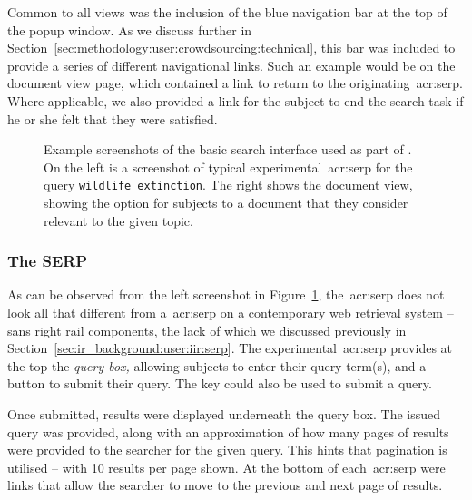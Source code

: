 Common to all views was the inclusion of the blue navigation bar at the top of the popup window. As we discuss further in Section~\ref{sec:methodology:user:crowdsourcing:technical}, this bar was included to provide a series of different navigational links. Such an example would be on the document view page, which contained a link to return to the originating~\gls{acr:serp}. Where applicable, we also provided a link for the subject to end the search task if he or she felt that they were satisfied.

\begin{figure}[t!]
    \centering
    \caption[Example screenshots of the \treconomics~interface]{Example screenshots of the basic search interface used as part of \treconomics. On the left is a screenshot of typical experimental~\gls{acr:serp} for the query \texttt{wildlife extinction}. The right shows the document view, showing the option for subjects to  a document that they consider relevant to the given topic.}
    \label{fig:interfaces}
\end{figure}

\subsubsection{The SERP}\label{sec:methodology:user:interface:serp}
As can be observed from the left screenshot in Figure~\ref{fig:interfaces}, the~\gls{acr:serp} does not look all that different from a~\gls{acr:serp} on a contemporary web retrieval system -- sans right rail components, the lack of which we discussed previously in Section~\ref{sec:ir_background:user:iir:serp}. The experimental~\gls{acr:serp} provides at the top the \emph{query box,} allowing subjects to enter their query term(s), and a button to submit their query. The \Return key could also be used to submit a query.

Once submitted, results were displayed underneath the query box. The issued query was provided, along with an approximation of how many pages of results were provided to the searcher for the given query. This hints that pagination is utilised -- with 10 results per page shown. At the bottom of each~\gls{acr:serp} were links that allow the searcher to move to the previous and next page of results.

